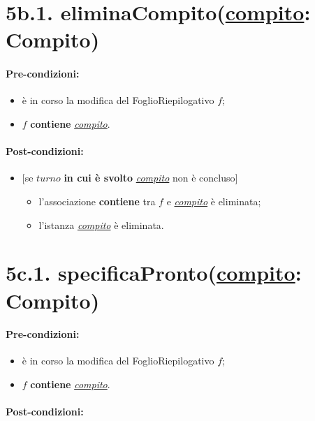 \section*{5b.1. eliminaCompito(\underline{compito}: Compito)}

\paragraph{Pre-condizioni:}

\begin{itemize}
  \item è in corso la modifica del FoglioRiepilogativo $f$;
  \item $f$ \textbf{contiene} \underline{\textit{compito}}.
\end{itemize}

\paragraph{Post-condizioni:}

\begin{itemize}
  \item $[$se $turno$ \textbf{in cui è svolto} \underline{\textit{compito}} non è concluso$]$ 
\begin{itemize}
  \item l'associazione \textbf{contiene} tra $f$ e \underline{\textit{compito}} è eliminata;
  \item l'istanza \underline{\textit{compito}} è eliminata.
\end{itemize}
\end{itemize}

\section*{5c.1. specificaPronto(\underline{compito}: Compito)}

\paragraph{Pre-condizioni:}

\begin{itemize}
  \item è in corso la modifica del FoglioRiepilogativo $f$;
  \item $f$ \textbf{contiene} \underline{\textit{compito}}.
\end{itemize}

\paragraph{Post-condizioni:}

